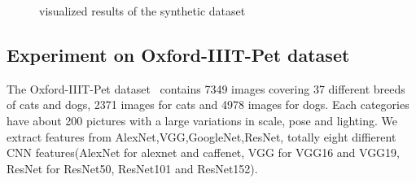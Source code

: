 \documentclass[letterpaper]{article}
\begin{document}
\begin{figure}[htp]
\center
    \caption{visualized results of the synthetic dataset} \label{fig:ensemble_cluster}
\end{figure}


\subsection{Experiment on Oxford-IIIT-Pet dataset}
The Oxford-IIIT-Pet dataset~\cite{parkhi12a} contains 7349 images covering 37 different breeds of cats and dogs, 2371 images for cats and 4978 images for dogs. Each categories have about 200 pictures with a large variations in scale, pose and lighting. We extract features from AlexNet,VGG,GoogleNet,ResNet, totally eight diffierent CNN features(AlexNet for alexnet and caffenet, VGG for VGG16 and VGG19, ResNet for ResNet50, ResNet101 and ResNet152).
\end{document}
